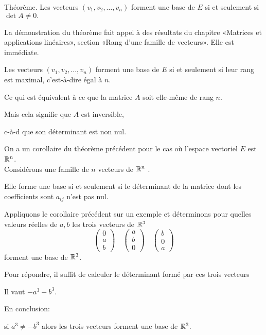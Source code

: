 Théorème. Les vecteurs $(v_1,v_2,\ldots,v_n)$ forment une base de $E$ si et seulement si $\det A \neq 0.$


\diapo

La démonstration du théorème fait appel à des résultats du chapitre «Matrices et applications linéaires»,
 section «Rang d'une famille de vecteurs». Elle est immédiate.

\change
Les vecteurs $(v_1,v_2,\ldots,v_n)$ forment une base de $E$ si et seulement si leur rang est maximal, 
c'est-à-dire égal à $n$.

\change
Ce qui est équivalent à ce que la matrice $A$ soit elle-même de rang $n$.

\change
Mais cela signifie que $A$ est inversible,

\change
c-à-d que son déterminant est non nul.

\change
On a un corollaire du théorème précédent pour le cas où l'espace vectoriel $E$ est $\mathbb{R}^n$.\\

Considérons une famille de $n$ vecteurs de $\mathbb{R}^n$ .

\change
Elle forme une base si et seulement si le déterminant de la matrice dont les coefficients sont 
$a_{ij}$ n'est pas nul.


\diapo

Appliquons le corollaire précédent sur un exemple et déter\-minons pour quelles valeurs réelles de $a,b$ les trois vecteurs  de $\mathbb{R}^3$
$$
\begin{pmatrix}0\\a\\b\end{pmatrix} \quad
\begin{pmatrix}a\\b\\0\end{pmatrix} \quad
\begin{pmatrix}b\\0\\a\end{pmatrix}$$
forment une base de $\mathbb{R}^3$. 

\change
Pour répondre, il suffit de calculer le déterminant formé par ces trois vecteurs

\change
Il vaut $ - a^3 - b^3$.

\change
En conclusion: 

\change
si $a^3 \neq - b^3$ alors les trois vecteurs forment une base de $\mathbb{R}^3$.

